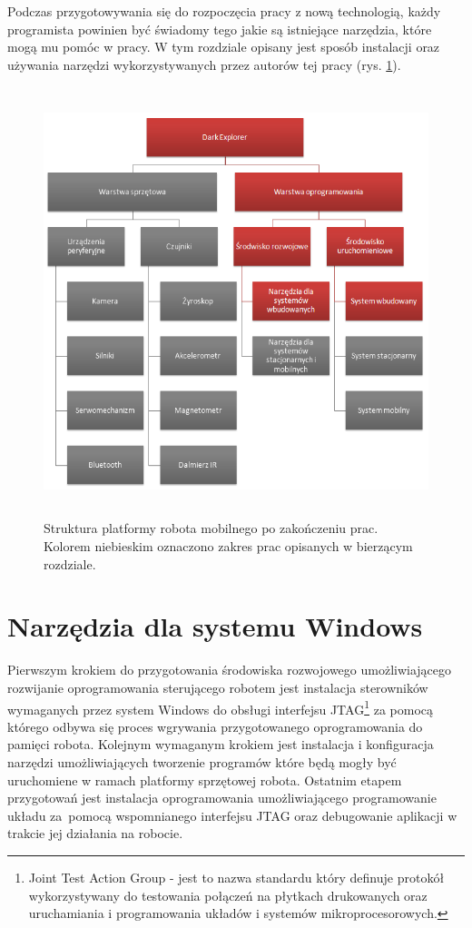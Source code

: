 Podczas przygotowywania się do rozpoczęcia pracy z nową technologią, każdy
programista powinien być świadomy tego jakie są istniejące narzędzia, które mogą
mu pomóc w pracy. W tym rozdziale opisany jest sposób instalacji oraz używania
narzędzi wykorzystywanych przez autorów tej pracy (rys.
\ref{fig:DarkExplorerPlatformIDE}).

\begin{figure}[!ht]
 \centering
 \includegraphics[height=125mm]{../images/ch03/dark_explorer_platform_ide_embeded.png}
 \caption{Struktura platformy robota mobilnego po zakończeniu prac. Kolorem niebieskim oznaczono zakres prac opisanych w bierzącym rozdziale.}
 \label{fig:DarkExplorerPlatformIDE}
\end{figure}

\section{Narzędzia dla systemu Windows}
\label{sec:embeded-win-tools}
Pierwszym krokiem do przygotowania środowiska rozwojowego umożliwiającego
rozwijanie oprogramowania sterującego robotem jest instalacja sterowników
wymaganych przez system Windows do obsługi interfejsu JTAG\footnote{Joint Test
Action Group - jest to nazwa standardu który definuje protokół wykorzystywany do
testowania połączeń na płytkach drukowanych oraz uruchamiania i programowania
układów i systemów mikroprocesorowych. } za pomocą którego odbywa się proces
wgrywania przygotowanego oprogramowania do pamięci robota. Kolejnym wymaganym
krokiem jest instalacja i konfiguracja narzędzi umożliwiających tworzenie
programów które będą mogły być uruchomiene w ramach platformy sprzętowej
robota. Ostatnim etapem przygotowań jest instalacja oprogramowania umożliwiającego programowanie układu za~pomocą wspomnianego interfejsu JTAG oraz
debugowanie aplikacji w trakcie jej działania na robocie.

